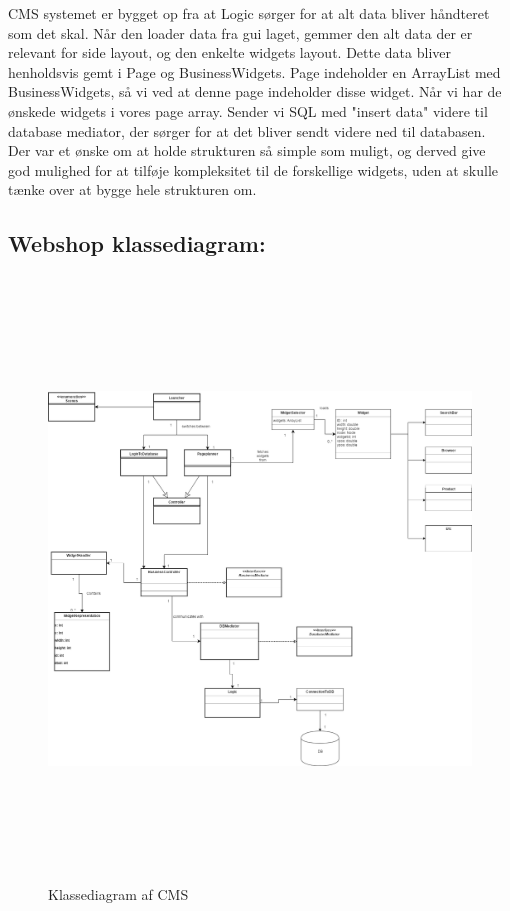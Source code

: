 CMS systemet er bygget op fra at Logic sørger for at alt data bliver håndteret som det skal. Når den loader data fra gui laget, gemmer den alt data der er relevant for side layout, og den enkelte widgets layout. Dette data bliver henholdsvis gemt i Page og BusinessWidgets. Page indeholder en ArrayList med BusinessWidgets, så vi ved at denne page indeholder disse widget. Når vi har de ønskede widgets i vores page array. Sender vi SQL  med "insert data" videre til database mediator, der sørger for at det bliver sendt videre ned til databasen. Der var et ønske om at holde strukturen så simple som muligt, og derved give god mulighed for at tilføje kompleksitet til de forskellige widgets, uden at skulle tænke over at bygge hele strukturen om. 

\subsection{Webshop klassediagram:}

\begin{figure}[H]
  \includegraphics[width=\linewidth, height=16cm]{elaborationsdokumentet/figurer/analyse/Klasse_Diagram_Analyse.png}
  \caption{Klassediagram af CMS}
  \label{fig:Classdiagram-webshop}
\end{figure}

